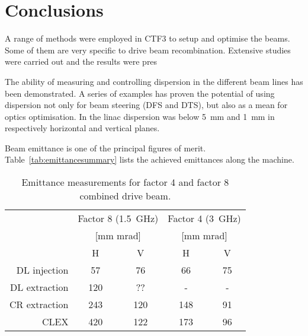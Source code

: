 \section{Conclusions}

A range of methods were employed in CTF3 to setup and optimise the beams. 
Some of them are very specific to drive beam recombination.
Extensive studies were carried out and the results were pres

The ability of measuring and controlling dispersion in the different beam lines has been demonstrated.
A series of examples has proven the potential of using dispersion not only for beam steering (DFS and DTS),
but also as a mean for optics optimisation. 
In the linac dispersion was below 5~mm and 1~mm in respectively horizontal and vertical planes.



Beam emittance is one of the principal figures of merit.
Table~\ref{tab:emittancesummary} lists the achieved emittances along the machine.

\begin{table}[h]
 \centering
  \begin{tabular}{rcccc}
    \hline
    
                                 & \multicolumn{2}{c}{Factor 8 (1.5~GHz)} & \multicolumn{2}{c}{Factor 4 (3~GHz)} \\
    {\multirow{3}{*}{Location} } & \multicolumn{2}{c}{[mm mrad]}          & \multicolumn{2}{c}{[mm mrad]}        \\
                                 & H     &    V                           &      H         & V                \\
    \hline \hline
                   DL injection  & 57   & 76                              &  66 &  75 \\
                   DL extraction & 120  & ??                              & -   &  - \\
                   CR extraction & 243  & 120                             & 148 &  91 \\
                   CLEX          & 420  & 122                             & 173 &  96 \\

    \hline
  \end{tabular}
\caption{Emittance measurements for factor 4 and factor 8 combined drive beam.}
\end{table}


